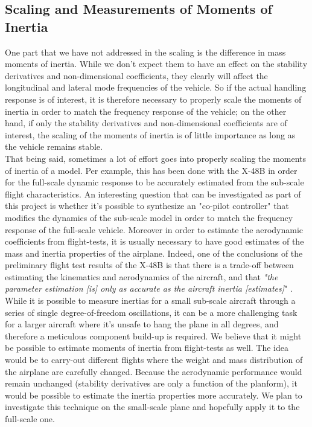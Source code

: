 \documentclass[titlepage,10pt]{article}
\begin{document}
\clearpage
\newpage

\subsection{Scaling and Measurements of Moments of Inertia}
One part that we have not addressed in the scaling is the difference in mass moments of inertia. While we don't expect them to have an effect on the stability derivatives and non-dimensional coefficients, they clearly will affect the longitudinal and lateral mode frequencies of the vehicle. So if the actual handling response is of interest, it is therefore necessary to properly scale the moments of inertia in order to match the frequency response of the vehicle; on the other hand, if only the stability derivatives and non-dimensional coefficients are of interest, the scaling of the moments of inertia is of little importance as long as the vehicle remains stable.\\

That being said, sometimes a lot of effort goes into properly scaling the moments of inertia of a model. Per example, this has been done with the X-48B in order for the full-scale dynamic response to be accurately estimated from the sub-scale flight characteristics. An interesting question that can be investigated as part of this project is whether it's possible to synthesize an "co-pilot controller" that modifies the dynamics of the sub-scale model in order to match the frequency response of the full-scale vehicle. Moreover in order to estimate the aerodynamic coefficients from flight-tests, it is usually necessary to have good estimates of the mass and inertia properties of the airplane. Indeed, one of the conclusions of the preliminary flight test results of the X-48B is that there is a trade-off between estimating the kinematics and aerodynamics of the aircraft, and that \textit{"the parameter estimation [is] only as accurate as the aircraft inertia [estimates]}" \cite{X48B}.\\

While it is possible to measure inertias for a small sub-scale aircraft through a series of single degree-of-freedom oscillations, it can be a more challenging task for a larger aircraft where it's unsafe to hang the plane in all degrees, and therefore a meticulous component build-up is required. We believe that it might be possible to estimate moments of inertia from flight-tests as well. The idea would be to carry-out different flights where the weight and mass distribution of the airplane are carefully changed. Because the aerodynamic performance would remain unchanged (stability derivatives are only a function of the planform), it would be possible to estimate the inertia properties more accurately. We plan to investigate this technique on the small-scale plane and hopefully apply it to the full-scale one.\\
\end{document}
